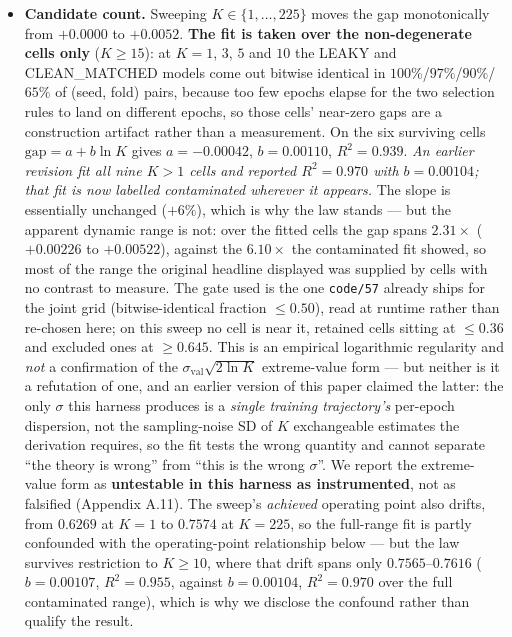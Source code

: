\documentclass[10pt]{article} %
\begin{document}
\begin{itemize}
\item \textbf{Candidate count.} Sweeping $K\in\{1,\ldots,225\}$ moves the
  gap monotonically from $+0.0000$ to $+0.0052$. \textbf{The fit is taken over
  the non-degenerate cells only} ($K\geq15$): at $K=1$, $3$, $5$ and $10$ the
  LEAKY and CLEAN\_MATCHED models come out bitwise identical in
  $100\%$/$97\%$/$90\%$/$65\%$ of (seed, fold) pairs, because too few epochs
  elapse for the two selection rules to land on different epochs, so those
  cells' near-zero gaps are a construction artifact rather than a measurement.
  On the six surviving cells $\text{gap}=a+b\ln K$ gives $a=-0.00042$,
  $b=0.00110$, $R^2=\mathbf{0.939}$. \emph{An earlier revision fit all nine
  $K>1$ cells and reported $R^2=0.970$ with $b=0.00104$; that fit is now
  labelled contaminated wherever it appears.} The slope is essentially
  unchanged ($+6\%$), which is why the law stands --- but the apparent dynamic
  range is not: over the fitted cells the gap spans $2.31\times$
  ($+0.00226$ to $+0.00522$), against the $6.10\times$ the contaminated fit
  showed, so most of the range the original headline displayed was supplied by
  cells with no contrast to measure. The gate used is the one
  \texttt{code/57} already ships for the joint grid (bitwise-identical fraction
  $\leq0.50$), read at runtime rather than re-chosen here; on this sweep no cell
  is near it, retained cells sitting at $\leq0.36$ and excluded ones at
  $\geq0.645$. This is an empirical logarithmic
  regularity and \emph{not} a confirmation of the
  $\sigma_{\text{val}}\sqrt{2\ln K}$ extreme-value form --- but neither is it a
    refutation of one, and an earlier version of this paper claimed the latter:
  the only $\sigma$ this harness produces is a \emph{single training
  trajectory's} per-epoch dispersion, not the sampling-noise SD of $K$
  exchangeable estimates the derivation requires, so the fit tests the wrong
  quantity and cannot separate ``the theory is wrong'' from ``this is the wrong
  $\sigma$''. We report the extreme-value form as \textbf{untestable in this
  harness as instrumented}, not as falsified (Appendix A.11). The sweep's
  \emph{achieved} operating point also drifts, from $0.6269$ at $K=1$ to
  $0.7574$ at $K=225$, so the full-range fit is partly confounded with the
  operating-point relationship below --- but the law survives restriction to
  $K\geq10$, where that drift spans only $0.7565$--$0.7616$ ($b=0.00107$,
  $R^2=0.955$, against $b=0.00104$, $R^2=0.970$ over the full contaminated
  range), which is why we disclose the confound rather than qualify the result.

\end{itemize}
\end{document}
